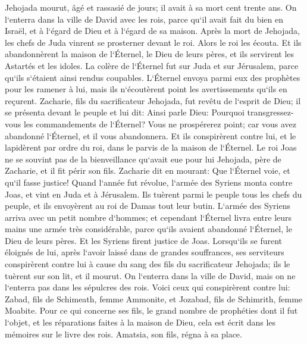\verse Jehojada mourut, âgé et rassasié de jours; il avait à sa mort cent trente ans. 
\verse On l`enterra dans la ville de David avec les rois, parce qu`il avait fait du bien en Israël, et à l`égard de Dieu et à l`égard de sa maison. 
\verse Après la mort de Jehojada, les chefs de Juda vinrent se prosterner devant le roi. Alors le roi les écouta. 
\verse Et ils abandonnèrent la maison de l`Éternel, le Dieu de leurs pères, et ils servirent les Astartés et les idoles. La colère de l`Éternel fut sur Juda et sur Jérusalem, parce qu`ils s`étaient ainsi rendus coupables. 
\verse L`Éternel envoya parmi eux des prophètes pour les ramener à lui, mais ils n`écoutèrent point les avertissements qu`ils en reçurent. 
\verse Zacharie, fils du sacrificateur Jehojada, fut revêtu de l`esprit de Dieu; il se présenta devant le peuple et lui dit: Ainsi parle Dieu: Pourquoi transgressez-vous les commandements de l`Éternel? Vous ne prospérerez point; car vous avez abandonné l`Éternel, et il vous abandonnera. 
\verse Et ils conspirèrent contre lui, et le lapidèrent par ordre du roi, dans le parvis de la maison de l`Éternel. 
\verse Le roi Joas ne se souvint pas de la bienveillance qu`avait eue pour lui Jehojada, père de Zacharie, et il fit périr son fils. Zacharie dit en mourant: Que l`Éternel voie, et qu`il fasse justice! 
\verse Quand l`année fut révolue, l`armée des Syriens monta contre Joas, et vint en Juda et à Jérusalem. Ils tuèrent parmi le peuple tous les chefs du peuple, et ils envoyèrent au roi de Damas tout leur butin. 
\verse L`armée des Syriens arriva avec un petit nombre d`hommes; et cependant l`Éternel livra entre leurs mains une armée très considérable, parce qu`ils avaient abandonné l`Éternel, le Dieu de leurs pères. Et les Syriens firent justice de Joas. 
\verse Lorsqu`ils se furent éloignés de lui, après l`avoir laissé dans de grandes souffrances, ses serviteurs conspirèrent contre lui à cause du sang des fils du sacrificateur Jehojada; ils le tuèrent sur son lit, et il mourut. On l`enterra dans la ville de David, mais on ne l`enterra pas dans les sépulcres des rois. 
\verse Voici ceux qui conspirèrent contre lui: Zabad, fils de Schimeath, femme Ammonite, et Jozabad, fils de Schimrith, femme Moabite. 
\verse Pour ce qui concerne ses fils, le grand nombre de prophéties dont il fut l`objet, et les réparations faites à la maison de Dieu, cela est écrit dans les mémoires sur le livre des rois. Amatsia, son fils, régna à sa place. 

